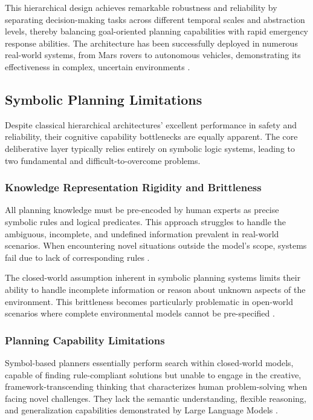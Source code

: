 This hierarchical design achieves remarkable robustness and reliability by separating decision-making tasks across different temporal scales and abstraction levels, thereby balancing goal-oriented planning capabilities with rapid emergency response abilities. The architecture has been successfully deployed in numerous real-world systems, from Mars rovers to autonomous vehicles, demonstrating its effectiveness in complex, uncertain environments \cite{volpe2001rover}.

\subsection{Symbolic Planning Limitations}

Despite classical hierarchical architectures' excellent performance in safety and reliability, their cognitive capability bottlenecks are equally apparent. The core deliberative layer typically relies entirely on symbolic logic systems, leading to two fundamental and difficult-to-overcome problems.

\subsubsection{Knowledge Representation Rigidity and Brittleness}

All planning knowledge must be pre-encoded by human experts as precise symbolic rules and logical predicates. This approach struggles to handle the ambiguous, incomplete, and undefined information prevalent in real-world scenarios. When encountering novel situations outside the model's scope, systems fail due to lack of corresponding rules \cite{russell2010artificial}.

The closed-world assumption inherent in symbolic planning systems limits their ability to handle incomplete information or reason about unknown aspects of the environment. This brittleness becomes particularly problematic in open-world scenarios where complete environmental models cannot be pre-specified \cite{reiter1980logic}.

\subsubsection{Planning Capability Limitations}

Symbol-based planners essentially perform search within closed-world models, capable of finding rule-compliant solutions but unable to engage in the creative, framework-transcending thinking that characterizes human problem-solving when facing novel challenges. They lack the semantic understanding, flexible reasoning, and generalization capabilities demonstrated by Large Language Models \cite{ghallab2004automated}.

